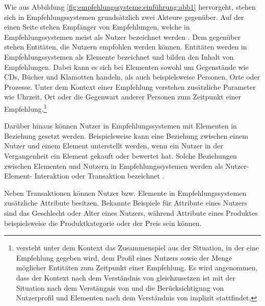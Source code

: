 Wie aus Abbildung \ref{fig:empfehlungssysteme:einführung:abb1} hervorgeht, stehen sich in  Empfehlungssystemen grundsätzlich zwei Akteure gegenüber.
Auf der einen Seite stehen Empfänger von Empfehlungen, welche in Empfehlungssystemen meist als Nutzer bezeichnet werden \cite[S. 8]{ricci:inbook}.
Dem gegenüber stehen Entitäten, die Nutzern empfohlen werden können.
Entitäten werden in Empfehlungssystemen als Elemente bezeichnet und bilden den Inhalt von Empfehlungen.
Dabei kann es sich bei Elementen sowohl um Gegenstände wie CDs, Bücher und Klamotten handeln, als auch beispielsweise Personen, Orte oder Prozesse.
Unter dem Kontext einer Empfehlung verstehen \textcite[S. 191]{adomavicius:3:inbook} zusätzliche Parameter wie Uhrzeit, Ort oder die Gegenwart anderer Personen zum Zeitpunkt einer Empfehlung.\footnote{\textcite[S. 1]{klahold:book} versteht unter dem Kontext das Zusammenspiel aus der Situation, in der eine Empfehlung gegeben wird, dem Profil eines Nutzers sowie der Menge möglicher Entitäten zum Zeitpunkt einer Empfehlung. Es wird angenommen, dass der Kontext nach dem Verständnis von \textcite{ricci:book} gleichzusetzen ist mit der Situation nach dem Verstängnis von \textcite{klahold:book} und die Berücksichtigung von Nutzerprofil und Elementen nach dem Verständnis von \textcite{ricci:book} implizit stattfindet.}

Darüber hinaus können Nutzer in Empfehlungssystemen mit Elementen in Beziehung gesetzt werden.
Beispielsweise kann eine Beziehung zwischen einem Nutzer und einem Element unterstellt werden, wenn ein Nutzer in der Vergangenheit ein Element gekauft oder bewertet hat.
Solche Beziehungen zwischen Elementen und Nutzern in Empfehlungssystemen werden als Nutzer- Element- Interaktion oder Transaktion bezeichnet \cite[S. 8]{recommenderSystems:2016}\cite[S. 9]{ricci:inbook}.

Neben Transaktionen können Nutzer bzw. Elemente in Empfehlungssystemen zusätzliche Attribute besitzen.
Bekannte Beispiele für Attribute eines Nutzers sind das Geschlecht oder Alter eines Nutzers, während Attribute eines Produktes beispielsweise die Produktkategorie oder der Preis sein können.

